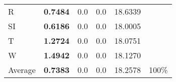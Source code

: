 \documentclass[11pt, a4paper]{article}
\begin{document}
\begin{table}[H]
\begin{tabular}{llllll}
R                                & \textbf{0.7484}                   & 0.0                               & 0.0                                  & 18.6339                                     &                                   \\
SI                        & \textbf{0.6186}                   & 0.0                               & 0.0                                  & 18.0005                                     &                                   \\
T                              & \textbf{1.2724}                   & 0.0                               & 0.0                                  & 18.0751                                     &                                   \\
W                             & \textbf{1.4942}                   & 0.0                               & 0.0                                  & 18.1270                                     &                                   \\ \hline
Average                               & \textbf{0.7383}                   & 0.0                               & 0.0                                  & 18.2578                                     & 100\%
\end{tabular}
\end{table}
\end{document}
